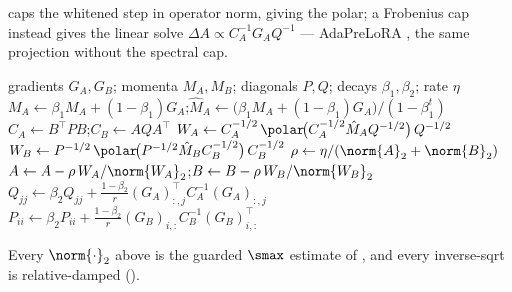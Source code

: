 \begin{remark}
 caps the whitened step in operator norm, giving the polar; a Frobenius cap instead gives the linear solve $\Delta A\propto C_A^{-1}G_A Q^{-1}$ --- AdaPreLoRA \cite{adaprelora}, the same projection without the spectral cap.
\end{remark}

\begin{algorithm}[t]
\caption{\methodname{} step for one LoRA pair $(A,B)$ at iteration $t$}
\label{alg:ours}
\begin{algorithmic}[1]
\Require gradients $G_A,G_B$; momenta $M_A,M_B$; diagonals $P,Q$; decays $\beta_1,\beta_2$; rate $\eta$
\State $M_A\gets\beta_1 M_A+(1-\beta_1)G_A$;\quad $\hat M_A\gets\big(\beta_1 M_A+(1-\beta_1)G_A\big)/(1-\beta_1^{t})$ 
\State $C_A\gets B^\top P B$;\quad $C_B\gets A Q A^\top$ 
\State $W_A\gets C_A^{-1/2}\,\polar\!\big(C_A^{-1/2}\hat M_A Q^{-1/2}\big)\,Q^{-1/2}$
\State $W_B\gets P^{-1/2}\,\polar\!\big(P^{-1/2}\hat M_B C_B^{-1/2}\big)\,C_B^{-1/2}$
\State $\rho\gets\eta/(\norm{A}_2+\norm{B}_2)$
\State $A\gets A-\rho\,W_A/\norm{W_A}_2$;\quad $B\gets B-\rho\,W_B/\norm{W_B}_2$
\State $Q_{jj}\gets\beta_2 Q_{jj}+\tfrac{1-\beta_2}{r}(G_A)_{:,j}^\top C_A^{-1}(G_A)_{:,j}$
\State $P_{ii}\gets\beta_2 P_{ii}+\tfrac{1-\beta_2}{r}(G_B)_{i,:}C_B^{-1}(G_B)_{i,:}^\top$
\end{algorithmic}
\end{algorithm}
\noindent Every $\norm{\cdot}_2$ above is the guarded $\smax$ estimate of , and every inverse-sqrt is relative-damped ().


